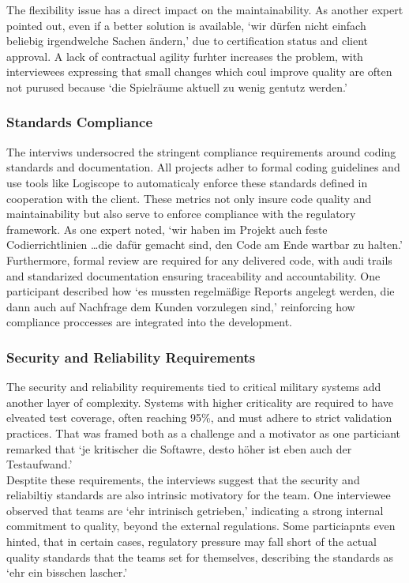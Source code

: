 The flexibility issue has a direct impact on the maintainability. As another expert pointed out, even if a better solution is available, `wir dürfen nicht einfach beliebig irgendwelche Sachen ändern,' due to certification status and client approval. A lack of contractual agility furhter increases the problem,
with interviewees expressing that small changes which coul improve quality are often not purused because `die Spielräume aktuell zu wenig gentutz werden.'

\subsubsection{Standards Compliance}
The interviws undersocred the stringent compliance requirements around coding standards and documentation. All projects adher to formal coding guidelines and use tools like Logiscope to automaticaly enforce these standards defined in cooperation with the client.
These metrics not only insure code quality and maintainability but also serve to enforce compliance with the regulatory framework. As one expert noted, `wir haben im Projekt auch feste Codierrichtlinien \ldots die dafür gemacht sind, den Code am Ende wartbar zu halten.'\\
Furthermore, formal review are required for any delivered code, with audi trails and standarized documentation ensuring traceability and accountability. One participant described how `es mussten regelmäßige Reports angelegt werden, die dann auch auf Nachfrage dem Kunden vorzulegen sind,' reinforcing how compliance proccesses are integrated into the development.

\subsubsection{Security and Reliability Requirements}
The security and reliability requirements tied to critical military systems add another layer of complexity. Systems with higher criticality are required to have elveated test coverage, often reaching 95\%, and must adhere to strict validation practices. That was framed both as a challenge and a motivator
as one particiant remarked that `je kritischer die Softawre, desto höher ist eben auch der Testaufwand.'\\
Desptite these requirements, the interviews suggest that the security and reliabiltiy standards are also intrinsic motivatory for the team. One interviewee observed that teams are `ehr intrinisch getrieben,' indicating a strong internal commitment to quality, beyond the external regulations. 
Some particiapnts even hinted, that in certain cases, regulatory pressure may fall short of the actual quality standards that the teams set for themselves, describing the standards as `ehr ein bisschen lascher.'

